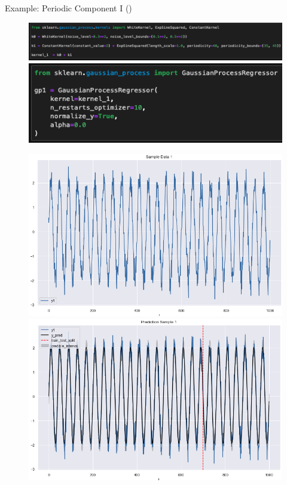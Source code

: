 \documentclass[10pt]{beamer}
\begin{document}
\begin{frame}{Example: Periodic Component I (\cite{gaussian_process_timeseries_2019})}{\cite[Section 1.7. Gaussian Processes]{scikitlearn}}
\begin{center}
\begin{figure}
\includegraphics[scale=0.3]{images/code_kernel_1_example3.png}
\includegraphics[scale=0.3]{images/gp1_example3.png}
\end{figure}
\end{center}
\begin{center}
\begin{figure}
\includegraphics[scale=0.20]{images/sample_1_example3.png}
\includegraphics[scale=0.20]{images/pred_1_example3.png}
\end{figure}
\end{center}
\end{frame}
\end{document}
